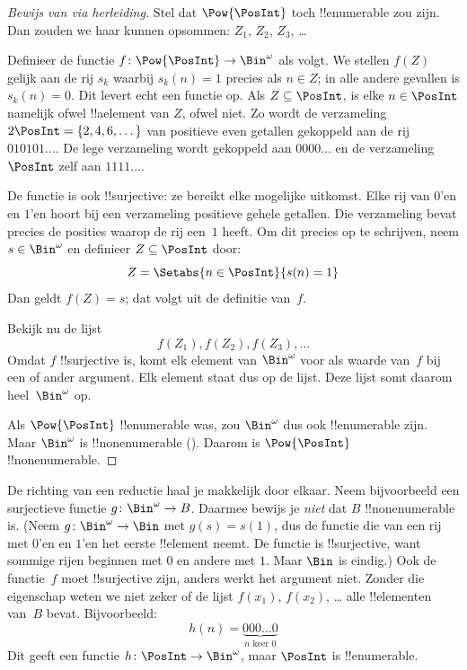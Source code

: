 \documentclass[../../../include/open-logic-section]{subfiles}
\begin{document}
\begin{proof}[Bewijs van {} via herleiding]
Stel dat $\Pow{\PosInt}$ toch !!{enumerable} zou zijn. Dan zouden we
haar kunnen opsommen: $Z_{1}$, $Z_{2}$, $Z_{3}$, \dots

Definieer de functie $f \colon \Pow{\PosInt} \to \Bin^\omega$ als
volgt. We stellen $f(Z)$ gelijk aan de rij $s_{k}$ waarbij $s_{k}(n) =
1$ precies als $n \in Z$; in alle andere gevallen is $s_k(n) = 0$.
Dit levert echt een functie op. Als $Z \subseteq \PosInt$, is elke $n
\in \PosInt$ namelijk ofwel !!a{element} van $Z$, ofwel niet. Zo wordt
de verzameling $2\PosInt = \{2, 4, 6, \dots\}$ van positieve even
getallen gekoppeld aan de rij $010101\dots$. De lege verzameling wordt
gekoppeld aan $0000\dots$ en de verzameling $\PosInt$ zelf aan
$1111\dots$.

De functie is ook !!{surjective}: ze bereikt elke mogelijke uitkomst.
Elke rij van $0$'en en $1$'en hoort bij een verzameling positieve gehele
getallen. Die verzameling bevat precies de posities
waarop de rij een~$1$ heeft. Om dit precies op te schrijven, neem
$s \in \Bin^\omega$ en definieer $Z \subseteq \PosInt$ door:
\[
Z = \Setabs{n \in \PosInt}{s(n) = 1}
\]
Dan geldt $f(Z) = s$; dat volgt uit de definitie van~$f$.

Bekijk nu de lijst
\[
f(Z_1), f(Z_2), f(Z_3), \dots
\]
Omdat $f$ !!{surjective} is, komt elk element van $\Bin^\omega$ voor
als waarde van~$f$ bij een of ander argument. Elk element staat dus op
de lijst. Deze lijst somt daarom heel~$\Bin^\omega$ op.

Als $\Pow{\PosInt}$ !!{enumerable} was, zou $\Bin^\omega$ dus ook
!!{enumerable} zijn. Maar $\Bin^\omega$ is !!{nonenumerable}
(). Daarom is $\Pow{\PosInt}$
!!{nonenumerable}.
\end{proof}

\begin{explain}
De richting van een reductie haal je makkelijk door elkaar. Neem
bijvoorbeeld een surjectieve functie $g \colon \Bin^\omega \to B$.
Daarmee bewijs je \emph{niet} dat $B$ !!{nonenumerable} is. (Neem $g
\colon \Bin^\omega \to \Bin$ met $g(s) = s(1)$, dus de functie die van
een rij met $0$'en en $1$'en het eerste !!{element} neemt. De functie
is !!{surjective}, want sommige rijen beginnen met $0$ en andere met
$1$. Maar $\Bin$ is eindig.) Ook de functie~$f$ moet !!{surjective}
zijn, anders werkt het argument niet. Zonder die eigenschap weten we
niet zeker of de lijst $f(x_1)$, $f(x_2)$, \dots{} alle
!!{element}en van~$B$ bevat.
Bijvoorbeeld:
\[
h(n) = \underbrace{000\dots0}_{\text{$n$ keer $0$}}
\]
Dit geeft een functie $h\colon \PosInt \to
\Bin^\omega$, maar $\PosInt$ is !!{enumerable}.
\end{explain}
\end{document}
